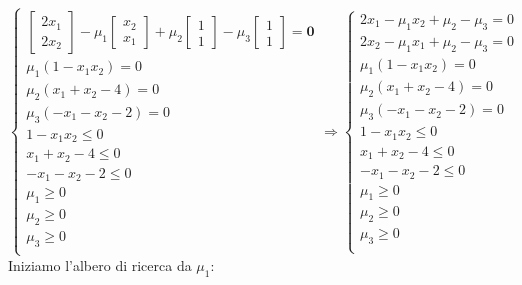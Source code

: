 \documentclass[\main/main.tex]{subfiles}
\begin{document}
\[
  \begin{cases}
    \begin{bmatrix}
      2x_1 \\
      2x_2
    \end{bmatrix} -
    \mu_1 \begin{bmatrix}
      x_2 \\
      x_1
    \end{bmatrix} +
    \mu_2 \begin{bmatrix}
      1 \\
      1
    \end{bmatrix} -
    \mu_3 \begin{bmatrix}
      1 \\
      1
    \end{bmatrix} = \bm{0} \\
    \mu_1 (1-x_1x_2) = 0                      \\
    \mu_2 (x_1 + x_2 -4) = 0                  \\
    \mu_3 (-x_1 - x_2 - 2) = 0                \\
    1-x_1x_2 \leq 0                           \\
    x_1 + x_2 -4 \leq 0                       \\
    -x_1 - x_2 - 2 \leq 0                     \\
    \mu_1 \geq 0                              \\
    \mu_2 \geq 0                              \\
    \mu_3 \geq 0                              \\
  \end{cases}
  \Rightarrow
  \begin{cases}
    2x_1-\mu_1x_2 + \mu_2 - \mu_3 = 0 \\
    2x_2-\mu_1x_1 + \mu_2 - \mu_3 = 0 \\
    \mu_1 (1-x_1x_2) = 0              \\
    \mu_2 (x_1 + x_2 -4) = 0          \\
    \mu_3 (-x_1 - x_2 - 2) = 0        \\
    1-x_1x_2 \leq 0                   \\
    x_1 + x_2 -4 \leq 0               \\
    -x_1 - x_2 - 2 \leq 0             \\
    \mu_1 \geq 0                      \\
    \mu_2 \geq 0                      \\
    \mu_3 \geq 0                      \\
  \end{cases}
\]
Iniziamo l'albero di ricerca da $\mu_1$:
\end{document}
